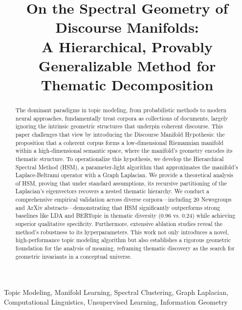 \documentclass[conference]{IEEEtran}
\theoremstyle{definition}
\begin{document}
\title{On the Spectral Geometry of Discourse Manifolds: \\ A Hierarchical, Provably Generalizable Method for Thematic Decomposition}

\author{
}

\maketitle

\begin{abstract}
The dominant paradigms in topic modeling, from probabilistic methods to modern neural approaches, fundamentally treat corpora as collections of documents, largely ignoring the intrinsic geometric structures that underpin coherent discourse. This paper challenges that view by introducing the Discourse Manifold Hypothesis: the proposition that a coherent corpus forms a low-dimensional Riemannian manifold within a high-dimensional semantic space, where the manifold's geometry encodes its thematic structure. To operationalize this hypothesis, we develop the Hierarchical Spectral Method (HSM), a parameter-light algorithm that approximates the manifold's Laplace-Beltrami operator with a Graph Laplacian. We provide a theoretical analysis of HSM, proving that under standard assumptions, its recursive partitioning of the Laplacian's eigenvectors recovers a nested thematic hierarchy. We conduct a comprehensive empirical validation across diverse corpora—including 20 Newsgroups and ArXiv abstracts—demonstrating that HSM significantly outperforms strong baselines like LDA and BERTopic in thematic diversity (0.96 vs. 0.24) while achieving superior qualitative specificity. Furthermore, extensive ablation studies reveal the method's robustness to its hyperparameters. This work not only introduces a novel, high-performance topic modeling algorithm but also establishes a rigorous geometric foundation for the analysis of meaning, reframing thematic discovery as the search for geometric invariants in a conceptual universe.
\end{abstract}

\begin{IEEEkeywords}
Topic Modeling, Manifold Learning, Spectral Clustering, Graph Laplacian, Computational Linguistics, Unsupervised Learning, Information Geometry
\end{IEEEkeywords}
\end{document}
